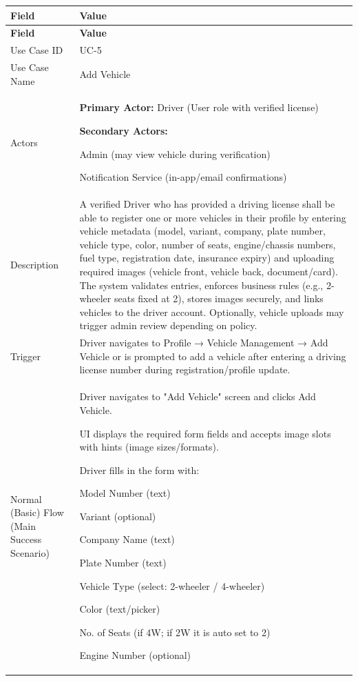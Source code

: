 \begin{longtable}{|p{3.5cm}|p{12cm}|}
\hline
\rowcolor{lightgray!30}
\textbf{Field} & \textbf{Value} \\
\hline
\endfirsthead
\hline
\rowcolor{lightgray!30}
\textbf{Field} & \textbf{Value} \\
\hline
\endhead
\hline
\endfoot
Use Case ID & UC-5 \\
\hline
Use Case Name & Add Vehicle \\
\hline
Actors &
\textbf{Primary Actor:} Driver (User role with verified license)

\textbf{Secondary Actors:}

Admin (may view vehicle during verification)

Notification Service (in-app/email confirmations) \\
\hline
Description &
A verified Driver who has provided a driving license shall be able to register one or more vehicles in their profile by entering vehicle metadata (model, variant, company, plate number, vehicle type, color, number of seats, engine/chassis numbers, fuel type, registration date, insurance expiry) and uploading required images (vehicle front, vehicle back, document/card). The system validates entries, enforces business rules (e.g., 2-wheeler seats fixed at 2), stores images securely, and links vehicles to the driver account. Optionally, vehicle uploads may trigger admin review depending on policy. \\
\hline
Trigger &
Driver navigates to Profile → Vehicle Management → Add Vehicle or is prompted to add a vehicle after entering a driving license number during registration/profile update. \\
\hline
Normal (Basic) Flow (Main Success Scenario) &
Driver navigates to "Add Vehicle" screen and clicks Add Vehicle.

UI displays the required form fields and accepts image slots with hints (image sizes/formats).

Driver fills in the form with:

Model Number (text)

Variant (optional)

Company Name (text)

Plate Number (text)

Vehicle Type (select: 2-wheeler / 4-wheeler)

Color (text/picker)

No. of Seats (if 4W; if 2W it is auto set to 2)

Engine Number (optional)


\end{longtable}
